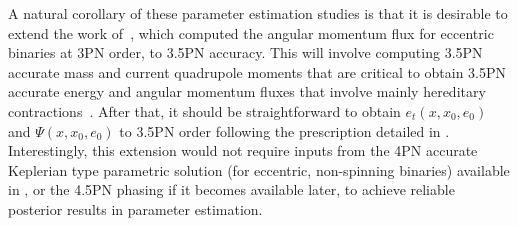 \documentclass[aps,prd,twocolumn,superscriptaddress,groupedaddress,nofootinbib,showpacs,eqsecnum,useAms]{revtex4-2}
\begin{document}
A natural corollary of these parameter estimation studies is that it is desirable  to extend the work of~\cite{Arun09}, which computed the angular momentum flux for eccentric binaries at 3PN order, to 3.5PN accuracy. 
This will involve computing 3.5PN accurate mass and current quadrupole moments that are critical to obtain 3.5PN accurate energy and angular momentum fluxes that involve mainly hereditary contractions~\cite{Arun09,LB_LR}.
After that, it should be straightforward  to obtain $e_t(x,x_0,e_0)$ and $\Psi (x, x_0, e_0) $ to 3.5PN order following the prescription detailed in \cite{TGHH}.
Interestingly, this extension would not require inputs from the 4PN accurate Keplerian type parametric solution (for eccentric, non-spinning binaries) available in \cite{CTGL21}, or the 4.5PN phasing if it becomes available later, to achieve reliable posterior results in parameter estimation.
\end{document}
